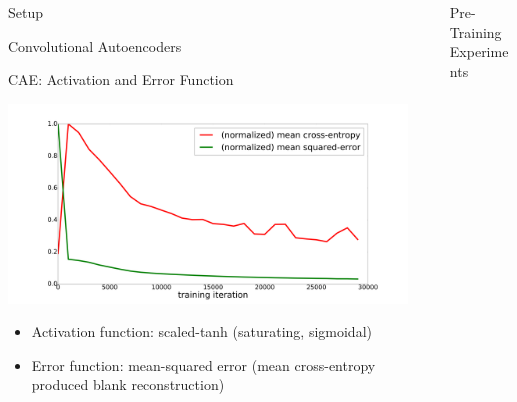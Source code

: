\documentclass[final]{beamer}
\newlength{\sepwid}
\newlength{\onecolwid}
\newlength{\threecolwid}
\begin{document}
\begin{frame}[t]
\begin{columns}[t]
\begin{column}{\onecolwid}
\begin{alertblock}{Setup}
\begin{block}{Convolutional Autoencoders}
\end{block}

\begin{block}{CAE: Activation and Error Function}
	\centering

	\includegraphics[width=.7\linewidth]{graphics/mse_ce_comparison.png}

	\begin{itemize}
		\item Activation function: scaled-tanh (saturating, sigmoidal)
		\item Error function: mean-squared error (mean cross-entropy produced blank reconstruction)
	\end{itemize}

\end{block}


\end{alertblock}


\end{column} %


\begin{column}{\sepwid}\end{column} %


\begin{column}{\threecolwid}


\begin{alertblock}{Pre-Training Experiments}

\centering

\begin{columns}[t, totalwidth=0.9\threecolwid] %





\end{columns}
\end{alertblock}
\end{column}
\end{columns}
\end{frame}
\end{document}
